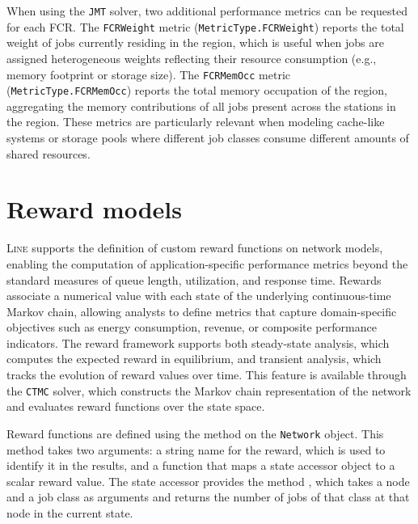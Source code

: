 When using the \texttt{JMT} solver, two additional performance metrics can be requested for each FCR. The \texttt{FCRWeight} metric (\texttt{MetricType.FCRWeight}) reports the total weight of jobs currently residing in the region, which is useful when jobs are assigned heterogeneous weights reflecting their resource consumption (e.g., memory footprint or storage size). The \texttt{FCRMemOcc} metric (\texttt{MetricType.FCRMemOcc}) reports the total memory occupation of the region, aggregating the memory contributions of all jobs present across the stations in the region. These metrics are particularly relevant when modeling cache-like systems or storage pools where different job classes consume different amounts of shared resources.

\section{Reward models}
\textsc{Line} supports the definition of custom reward functions on network models, enabling the computation of application-specific performance metrics beyond the standard measures of queue length, utilization, and response time. Rewards associate a numerical value with each state of the underlying continuous-time Markov chain, allowing analysts to define metrics that capture domain-specific objectives such as energy consumption, revenue, or composite performance indicators. The reward framework supports both steady-state analysis, which computes the expected reward in equilibrium, and transient analysis, which tracks the evolution of reward values over time. This feature is available through the \texttt{CTMC} solver, which constructs the Markov chain representation of the network and evaluates reward functions over the state space.

Reward functions are defined using the  method on the \texttt{Network} object. This method takes two arguments: a string name for the reward, which is used to identify it in the results, and a function that maps a state accessor object to a scalar reward value. The state accessor provides the method , which takes a node and a job class as arguments and returns the number of jobs of that class at that node in the current state.

